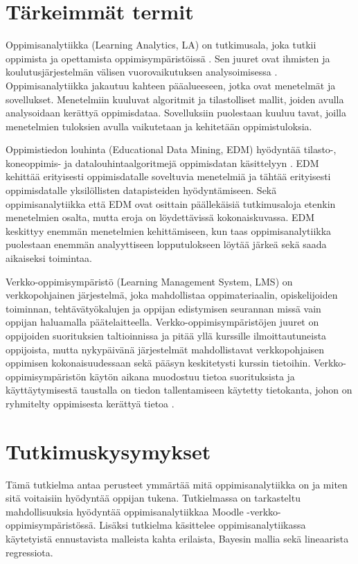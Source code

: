 \section{Tärkeimmät termit}
Oppimisanalytiikka (Learning Analytics, LA) on tutkimusala, joka tutkii oppimista ja opettamista oppimisympäristöissä \citep{longPenetratingFogAnalytics2011}. Sen juuret ovat ihmisten ja koulutusjärjestelmän välisen vuorovaikutuksen analysoimisessa \citep{siemensLearningAnalyticsEmergence2013}. Oppimisanalytiikka jakautuu kahteen pääalueeseen, jotka ovat menetelmät ja sovellukset. Menetelmiin kuuluvat algoritmit ja tilastolliset mallit, joiden avulla analysoidaan kerättyä oppimisdataa. Sovelluksiin puolestaan kuuluu tavat, joilla menetelmien tuloksien avulla vaikutetaan ja kehitetään oppimistuloksia.

Oppimistiedon louhinta (Educational Data Mining, EDM) hyödyntää tilasto-, koneoppimis- ja datalouhintaalgoritmejä oppimisdatan käsittelyyn \citep{romeroEducationalDataMining2010,siemensLearningAnalyticsEmergence2013}. EDM kehittää erityisesti oppimisdatalle soveltuvia menetelmiä ja tähtää erityisesti oppimisdatalle yksilöllisten datapisteiden hyödyntämiseen. Sekä oppimisanalytiikka että EDM ovat osittain päällekäisiä tutkimusaloja etenkin menetelmien osalta, mutta eroja on löydettävissä kokonaiskuvassa. EDM keskittyy enemmän menetelmien kehittämiseen, kun taas oppimisanalytiikka puolestaan enemmän analyyttiseen lopputulokseen löytää järkeä sekä saada aikaiseksi toimintaa.

Verkko-oppimisympäristö (Learning Management System, LMS) on verkkopohjainen järjestelmä, joka mahdollistaa oppimateriaalin, opiskelijoiden toiminnan, tehtävätyökalujen ja oppijan edistymisen seurannan \citep{mohdChoosingRightLearning2016} missä vain oppijan haluamalla päätelaitteella. Verkko-oppimisympäristöjen juuret on oppijoiden suorituksien taltioinnissa ja pitää yllä kurssille ilmoittautuneista oppijoista, mutta nykypäivänä järjestelmät mahdollistavat verkkopohjaisen oppimisen kokonaisuudessaan sekä pääsyn keskitetysti kurssin tietoihin. Verkko-oppimisympäristön käytön aikana muodostuu tietoa suorituksista ja käyttäytymisestä taustalla on tiedon tallentamiseen käytetty tietokanta, johon on ryhmitelty oppimisesta kerättyä tietoa \citep{romeroSurveyPreProcessingEducational2014}.

\section{Tutkimuskysymykset}
Tämä tutkielma antaa perusteet ymmärtää mitä oppimisanalytiikka on ja miten sitä voitaisiin hyödyntää oppijan tukena. Tutkielmassa on tarkasteltu mahdollisuuksia hyödyntää oppimisanalytiikkaa Moodle -verkko-oppimisympäristössä. Lisäksi tutkielma käsittelee oppimisanalytiikassa käytetyistä ennustavista malleista kahta erilaista, Bayesin mallia sekä lineaarista regressiota.

